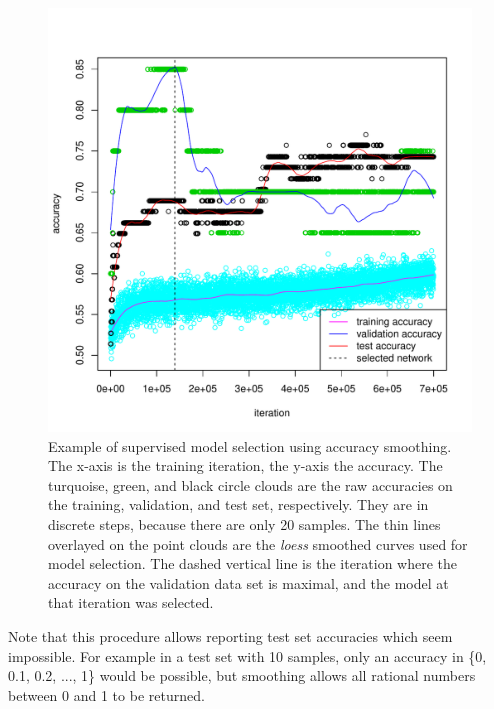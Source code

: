 \begin{figure}
\begin{centering}
\includegraphics[width=0.5\paperwidth]{images/breast_cancer_15-smoothed_accuracy-at}
\par\end{centering}
\caption[Example of supervised model selection using accuracy smoothing.]{\label{fig:Example-of-supervised-model-selection}Example of supervised
model selection using accuracy smoothing. The x-axis is the training
iteration, the y-axis the accuracy. The turquoise, green, and black
circle clouds are the raw accuracies on the training, validation,
and test set, respectively. They are in discrete steps, because there
are only 20 samples. The thin lines overlayed on the point clouds
are the \emph{loess }smoothed curves used for model selection. The
dashed vertical line is the iteration where the accuracy on the validation
data set is maximal, and the model at that iteration was selected.}
\end{figure}

Note that this procedure allows reporting test set accuracies which
seem impossible. For example in a test set with 10 samples, only an
accuracy in \{0, 0.1, 0.2, ..., 1\} would be possible, but smoothing
allows all rational numbers between 0 and 1 to be returned.

